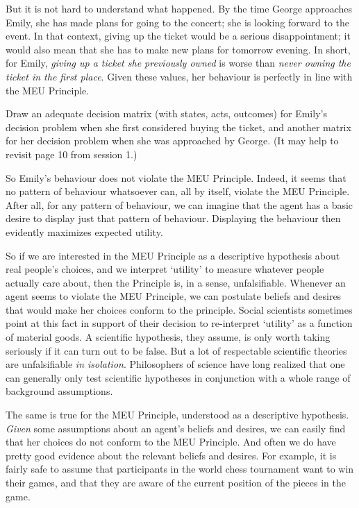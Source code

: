 But it is not hard to understand what happened. By the time George
approaches Emily, she has made plans for going to the concert; she is
looking forward to the event. In that context, giving up the ticket
would be a serious disappointment; it would also mean that she has to
make new plans for tomorrow evening. In short, for Emily, \emph{giving
  up a ticket she previously owned} is worse than \emph{never owning
  the ticket in the first place}. Given these values, her behaviour is
perfectly in line with the MEU Principle.

\begin{exercise}
  Draw an adequate decision matrix (with states, acts, outcomes) for
  Emily's decision problem when she first considered buying the
  ticket, and another matrix for her decision problem when she was
  approached by George. (It may help to revisit page 10 from session 1.)
  

\end{exercise}

So Emily's behaviour does not violate the MEU Principle. Indeed, it
seems that no pattern of behaviour whatsoever can, all by itself,
violate the MEU Principle. After all, for any pattern of behaviour, we
can imagine that the agent has a basic desire to display just that
pattern of behaviour. Displaying the behaviour then evidently
maximizes expected utility.

So if we are interested in the MEU Principle as a descriptive
hypothesis about real people's choices, and we interpret `utility' to
measure whatever people actually care about, then the Principle is, in
a sense, unfalsifiable. Whenever an agent seems to violate the MEU
Principle, we can postulate beliefs and desires that would make her
choices conform to the principle. Social scientists sometimes point at
this fact in support of their decision to re-interpret `utility' as a
function of material goods. A scientific hypothesis, they assume, is
only worth taking seriously if it can turn out to be false. But a lot
of respectable scientific theories are unfalsifiable \emph{in
  isolation}. Philosophers of science have long realized that one can
generally only test scientific hypotheses in conjunction with a whole
range of background assumptions.

The same is true for the MEU Principle, understood as a descriptive
hypothesis. \emph{Given} some assumptions about an agent's beliefs and
desires, we can easily find that her choices do not conform to the MEU
Principle. And often we do have pretty good evidence about the
relevant beliefs and desires. For example, it is fairly safe to assume
that participants in the world chess tournament want to win their
games, and that they are aware of the current position of the pieces
in the game.

